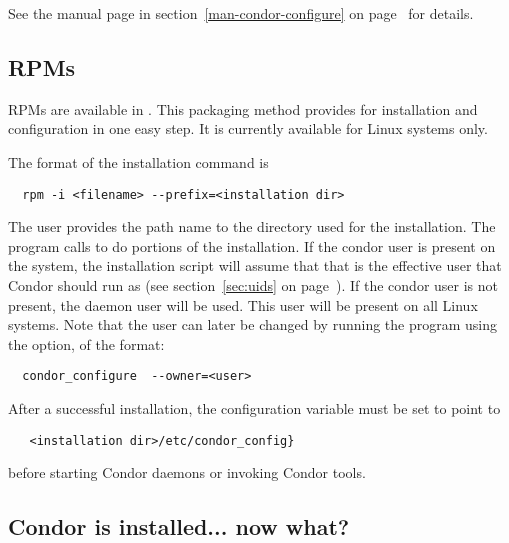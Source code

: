 See the  manual page in
section~\ref{man-condor-configure} on
page~\pageref{man-condor-configure} for details.

\subsection{\label{sec:install-rpms} RPMs}

RPMs are available in \VersionNotice.
This packaging method provides for installation and configuration
in one easy step.
It is currently available for Linux systems only.

The format of the installation command is
\begin{verbatim}
  rpm -i <filename> --prefix=<installation dir>
\end{verbatim}

The user provides the path name to the directory
used for the installation.
The  program calls  to do portions
of the installation.
If the condor user is present on the system,
the installation script will
assume that that is the effective user that Condor should run as
(see 
section~\ref{sec:uids} on
page~\pageref{sec:uids}).
If the condor user is not present,
the daemon user 
will be used.
This user will be present on all Linux systems. 
Note that the user can later be changed by running the 
program using the  option, of the format:
\begin{verbatim}
  condor_configure  --owner=<user>
\end{verbatim}

After a successful installation,
the  configuration 
variable must be set to point to
\begin{verbatim}
   <installation dir>/etc/condor_config}
\end{verbatim}
before starting Condor daemons or invoking Condor tools.

\subsection{\label{installed-now-what}
Condor is installed... now what?}


